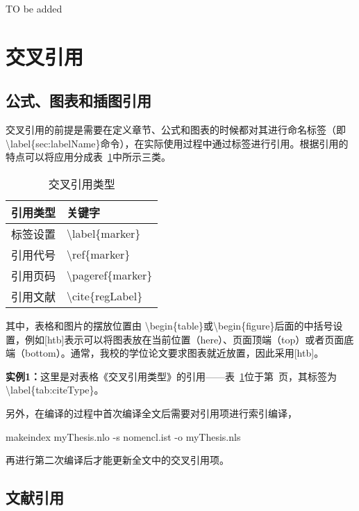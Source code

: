 TO be added

\section{交叉引用}
\subsection{公式、图表和插图引用}
\label{sec:refofFigAndTab}
交叉引用的前提是需要在定义章节、公式和图表的时候都对其进行命名标签（即\textbackslash label\{sec:labelName\}命令），在实际使用过程中通过标签进行引用。根据引用的特点可以将应用分成表~\ref{tab:citeType}中所示三类。

\begin{table}[htb]
 \centering
  \caption{交叉引用类型}       %
  \label{tab:citeType}    %
  \begin{tabular}{cl}
    \hline
    引用类型     & 关键字     \\
    \hline
    标签设置        & \textbackslash label\{marker\}  \\
    引用代号        & \textbackslash ref\{marker\}    \\
    引用页码        & \textbackslash pageref\{marker\} \\
    引用文献        & \textbackslash cite\{regLabel\} \\
    \hline
  \end{tabular}
\end{table}

其中，表格和图片的摆放位置由 \textbackslash begin\{table\}或\textbackslash begin\{figure\}后面的中括号设置，例如[htb]表示可以将图表放在当前位置（here）、页面顶端（top）或者页面底端（bottom）。通常，我校的学位论文要求图表就近放置，因此采用[htb]。

{\bf{实例1：}}这里是对表格《交叉引用类型》的引用——表~\ref{tab:citeType}位于第~\pageref{tab:citeType}页，其标签为\textbackslash label\{tab:citeType\}。

另外，在编译的过程中首次编译全文后需要对引用项进行索引编译，

\begin{center}
  {\color{blue}makeindex myThesis.nlo -s nomencl.ist -o myThesis.nls}
\end{center}

再进行第二次编译后才能更新全文中的交叉引用项。

\subsection{文献引用}
\label{sec:citeRefs}

